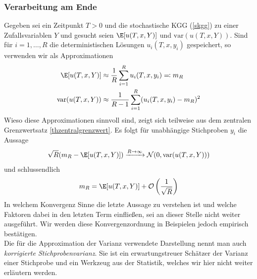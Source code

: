 \subsubsection*{Verarbeitung am Ende}
Gegeben sei ein Zeitpunkt $T>0$ und die stochastische KGG (\ref{skgg}) zu einer Zufallsvariablen $Y$ und gesucht seien $\E[u(T,x,Y)]$ und $\text{var}(u(T,x,Y))$. Sind für $i=1,\dots,R$ die deterministischen Lösungen $u_i(T,x,y_i)$ gespeichert, so verwenden wir als Approximationen
\begin{align*}
\E[u(T,x,Y)]&\approx \frac{1}{R}\sum_{i=1}^R u_i(T,x,y_i)\eqqcolon m_R\\
\text{var}(u(T,x,Y)) &\approx \frac{1}{R-1}\sum_{i=1}^R(u_i(T,x,y_i)-m_R)^2
\end{align*}
Wieso diese Approximationen sinnvoll sind, zeigt sich teilweise aus dem zentralen Grenzwertsatz \ref{thzentralgrenzwert}. Es folgt für unabhängige Stichproben $y_i$ die Aussage \[\sqrt{R}(m_R-\E[u(T,x,Y)])\xrightarrow{R\to\infty}\mathcal{N}(0,\text{var}(u(T,x,Y)))\]
und schlussendlich 
\[m_R=\E[u(T,x,Y)] + \mathcal{O}\left(\frac{1}{\sqrt{R}}\right)\]
In welchem Konvergenz Sinne die letzte Aussage zu verstehen ist und welche Faktoren dabei in den letzten Term einfließen, sei an dieser Stelle nicht weiter ausgeführt. Wir werden diese Konvergenzordnung in Beispielen jedoch empirisch bestätigen.\\[0.2cm]
Die für die Approximation der Varianz verwendete Darstellung nennt man auch \emph{korrigierte Stichprobenvarianz}. Sie ist ein erwartungstreuer Schätzer der Varianz einer Stichprobe und ein Werkzeug aus der Statistik, welches wir hier nicht weiter erläutern werden.
